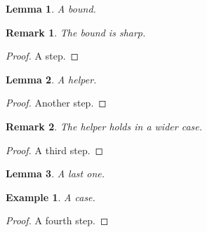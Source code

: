 \documentclass{article}
\newtheorem{lemma}{Lemma}
\newtheorem{remark}{Remark}
\newtheorem{example}{Example}
\begin{document}
\begin{lemma}
A bound.
\end{lemma}
\begin{remark}
The bound is sharp.
\end{remark}
\begin{proof}
A step.
\end{proof}
\begin{lemma}
A helper.
\end{lemma}
\begin{proof}
Another step.
\end{proof}
\begin{remark}
The helper holds in a wider case.
\end{remark}
\begin{proof}
A third step.
\end{proof}
\begin{lemma}
A last one.
\end{lemma}
\begin{example}
A case.
\end{example}
\begin{proof}
A fourth step.
\end{proof}
\end{document}

